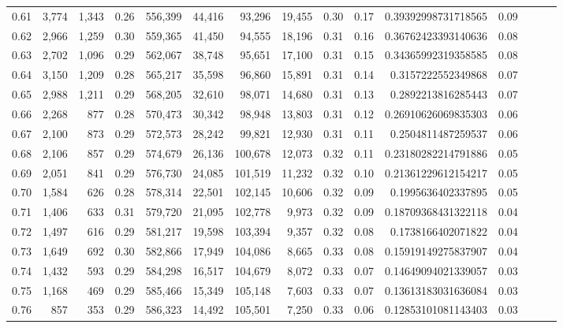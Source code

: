 \begin{tabular}{rrrrrrrrrrrrrrr}
0.61 &   3,774 &  1,343 &  0.26 &  556,399 &   44,416 &   93,296 &   19,455 &  0.30 &  0.17 &   0.39392998731718565 &      0.09 \\
0.62 &   2,966 &  1,259 &  0.30 &  559,365 &   41,450 &   94,555 &   18,196 &  0.31 &  0.16 &   0.36762423393140636 &      0.08 \\
0.63 &   2,702 &  1,096 &  0.29 &  562,067 &   38,748 &   95,651 &   17,100 &  0.31 &  0.15 &   0.34365992319358585 &      0.08 \\
0.64 &   3,150 &  1,209 &  0.28 &  565,217 &   35,598 &   96,860 &   15,891 &  0.31 &  0.14 &    0.3157222552349868 &      0.07 \\
0.65 &   2,988 &  1,211 &  0.29 &  568,205 &   32,610 &   98,071 &   14,680 &  0.31 &  0.13 &    0.2892213816285443 &      0.07 \\
0.66 &   2,268 &    877 &  0.28 &  570,473 &   30,342 &   98,948 &   13,803 &  0.31 &  0.12 &   0.26910626069835303 &      0.06 \\
0.67 &   2,100 &    873 &  0.29 &  572,573 &   28,242 &   99,821 &   12,930 &  0.31 &  0.11 &    0.2504811487259537 &      0.06 \\
0.68 &   2,106 &    857 &  0.29 &  574,679 &   26,136 &  100,678 &   12,073 &  0.32 &  0.11 &   0.23180282214791886 &      0.05 \\
0.69 &   2,051 &    841 &  0.29 &  576,730 &   24,085 &  101,519 &   11,232 &  0.32 &  0.10 &   0.21361229612154217 &      0.05 \\
0.70 &   1,584 &    626 &  0.28 &  578,314 &   22,501 &  102,145 &   10,606 &  0.32 &  0.09 &    0.1995636402337895 &      0.05 \\
0.71 &   1,406 &    633 &  0.31 &  579,720 &   21,095 &  102,778 &    9,973 &  0.32 &  0.09 &   0.18709368431322118 &      0.04 \\
0.72 &   1,497 &    616 &  0.29 &  581,217 &   19,598 &  103,394 &    9,357 &  0.32 &  0.08 &    0.1738166402071822 &      0.04 \\
0.73 &   1,649 &    692 &  0.30 &  582,866 &   17,949 &  104,086 &    8,665 &  0.33 &  0.08 &   0.15919149275837907 &      0.04 \\
0.74 &   1,432 &    593 &  0.29 &  584,298 &   16,517 &  104,679 &    8,072 &  0.33 &  0.07 &   0.14649094021339057 &      0.03 \\
0.75 &   1,168 &    469 &  0.29 &  585,466 &   15,349 &  105,148 &    7,603 &  0.33 &  0.07 &   0.13613183031636084 &      0.03 \\
0.76 &     857 &    353 &  0.29 &  586,323 &   14,492 &  105,501 &    7,250 &  0.33 &  0.06 &   0.12853101081143403 &      0.03 \\

\end{tabular}

